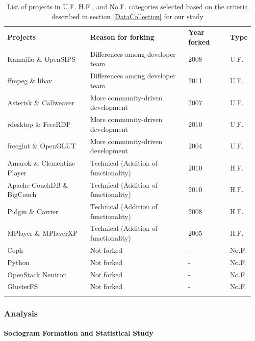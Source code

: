 \documentclass[12pt]{report}
\begin{document}
\begin{table}
\centering
\caption{List of projects in U.F. H.F., and No.F. categories selected based on the criteria described in section \ref{DataCollection} for our study}
\label{forkedProjectsDataCollected}
\begin{tabular}{p{} p{} p{} p{}}
\hline\noalign{\smallskip}
\textbf{Projects} & \textbf{Reason for forking} & \textbf{Year forked} & \textbf{Type}\\
\noalign{\smallskip}\hline\noalign{\smallskip}
Kamailio \& OpenSIPS & Differences among developer team & 2008 & U.F.\\ \hline
ffmpeg \& libav & Differences among developer team & 2011 & U.F.\\ \hline
Asterisk \& Callweaver & More community-driven development & 2007 & U.F.\\ \hline
rdesktop \& FreeRDP  & More community-driven development & 2010 & U.F.\\ \hline
freeglut \& OpenGLUT & More community-driven development & 2004 & U.F.\\ \hline
Amarok \& Clementine Player & Technical (Addition of functionality) & 2010 & H.F.\\ \hline
Apache CouchDB \& BigCouch & Technical (Addition of functionality) & 2010 & H.F.\\ \hline
Pidgin \& Carrier & Technical (Addition of functionality) & 2008 & H.F.\\ \hline
MPlayer \& MPlayerXP & Technical (Addition of functionality) & 2005 & H.F.\\ \hline
Ceph  & Not forked & - & No.F.\\ \hline
Python & Not forked & - & No.F.\\ \hline
OpenStack Neutron & Not forked & - & No.F.\\ \hline
GlusterFS & Not forked & - & No.F.\\ 
\noalign{\smallskip}\hline
\end{tabular}
\end{table}


\subsubsection{Analysis}
\paragraph*{Sociogram Formation and Statistical Study}
\end{document}
